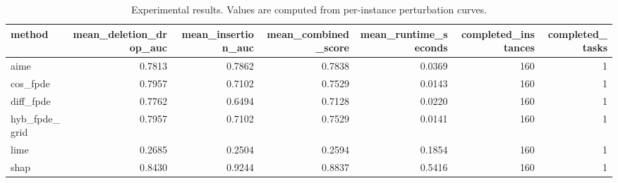 \begin{table}[t]
\caption{Experimental results. Values are computed from per-instance perturbation curves.}
\label{tab:main_results_computed}
\centering
\begin{tabular}{lrrrrrr}
\toprule
method & mean\_deletion\_drop\_auc & mean\_insertion\_auc & mean\_combined\_score & mean\_runtime\_seconds & completed\_instances & completed\_tasks \\
\midrule
aime & 0.7813 & 0.7862 & 0.7838 & 0.0369 & 160 & 1 \\
cos\_fpde & 0.7957 & 0.7102 & 0.7529 & 0.0143 & 160 & 1 \\
diff\_fpde & 0.7762 & 0.6494 & 0.7128 & 0.0220 & 160 & 1 \\
hyb\_fpde\_grid & 0.7957 & 0.7102 & 0.7529 & 0.0141 & 160 & 1 \\
lime & 0.2685 & 0.2504 & 0.2594 & 0.1854 & 160 & 1 \\
shap & 0.8430 & 0.9244 & 0.8837 & 0.5416 & 160 & 1 \\
\bottomrule
\end{tabular}

\end{table}
